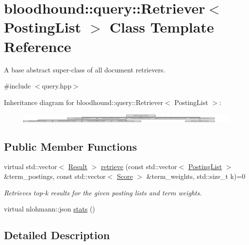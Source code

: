 \hypertarget{classbloodhound_1_1query_1_1Retriever}{}\section{bloodhound\+:\+:query\+:\+:Retriever$<$ Posting\+List $>$ Class Template Reference}
\label{classbloodhound_1_1query_1_1Retriever}


A base abstract super-\/class of all document retrievers.  




{\ttfamily \#include $<$query.\+hpp$>$}

Inheritance diagram for bloodhound\+:\+:query\+:\+:Retriever$<$ Posting\+List $>$\+:\begin{figure}[H]
\begin{center}
\leavevmode
\includegraphics[height=0.484848cm]{classbloodhound_1_1query_1_1Retriever}
\end{center}
\end{figure}
\subsection*{Public Member Functions}
\begin{DoxyCompactItemize}
\item 
virtual std\+::vector$<$ \mbox{\hyperlink{structbloodhound_1_1query_1_1Result}{Result}} $>$ \mbox{\hyperlink{classbloodhound_1_1query_1_1Retriever_ae3c6a4628c5580e620c213b3dcd47c2b}{retrieve}} (const std\+::vector$<$ \mbox{\hyperlink{classbloodhound_1_1PostingList}{Posting\+List}} $>$ \&term\+\_\+postings, const std\+::vector$<$ \mbox{\hyperlink{structbloodhound_1_1Score}{Score}} $>$ \&term\+\_\+weights, std\+::size\+\_\+t k)=0
\begin{DoxyCompactList}\small\item\em Retrieves top-\/k results for the given posting lists and term weights. \end{DoxyCompactList}\item 
virtual nlohmann\+::json \mbox{\hyperlink{classbloodhound_1_1query_1_1Retriever_a58da32a5139b980ba874f8b5e6bb89ec}{stats}} ()
\end{DoxyCompactItemize}


\subsection{Detailed Description}
